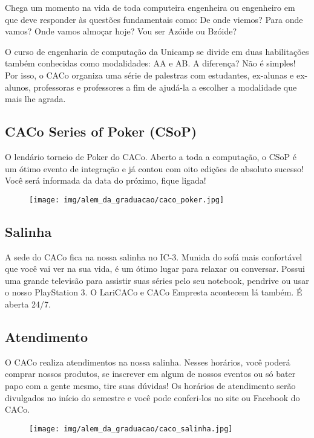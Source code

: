 Chega um momento na vida de toda computeira engenheira ou engenheiro em que
deve responder às questões fundamentais como: De onde viemos? Para onde vamos?
Onde vamos almoçar hoje? Vou ser Azóide ou Bzóide?

O curso de engenharia de computação da Unicamp se divide em duas habilitações
também conhecidas como modalidades: AA e AB. A diferença? Não é simples! Por
isso, o CACo organiza uma série de palestras com estudantes, ex-alunas e
ex-alunos, professoras e professores a fim de ajudá-la a escolher a modalidade
que mais lhe agrada.

\subsection{CACo Series of Poker (CSoP)}

O lendário torneio de Poker do CACo. Aberto a toda a computação, o CSoP é um
ótimo evento de integração e já contou com oito edições de absoluto sucesso!
Você será informada da data do próximo, fique ligada!

\begin{figure}[H]
  \centering
  \texttt{[image: img/alem\_da\_graduacao/caco\_poker.jpg]}
\end{figure}

\subsection{Salinha}

A sede do CACo fica na nossa salinha no IC-3. Munida do sofá mais confortável
que você vai ver na sua vida, é um ótimo lugar para relaxar ou conversar.
Possui uma grande televisão para assistir suas séries pelo seu notebook,
pendrive ou usar o nosso PlayStation 3. O LariCACo e CACo Empresta acontecem lá
também. É aberta 24/7.

\subsection{Atendimento}

O CACo realiza atendimentos na nossa salinha. Nesses horários, você poderá
comprar nossos produtos, se inscrever em algum de nossos eventos ou só bater
papo com a gente mesmo, tire suas dúvidas! Os horários de atendimento serão
divulgados no início do semestre e você pode conferi-los no site ou Facebook do
CACo.

\begin{figure}[H]
  \centering
  \texttt{[image: img/alem\_da\_graduacao/caco\_salinha.jpg]}
\end{figure}

